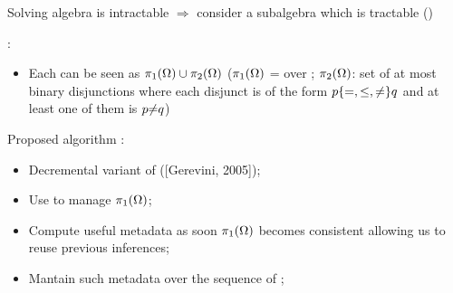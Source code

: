 \begin{frame}{Solving \DOHSATProblemName{}}
    \IAName{} algebra is intractable $\Rightarrow$ consider a subalgebra which is tractable (\OrdHornName{})

    \DOHSATProblemName{}:
    \begin{itemize}
        \item Each \TCSPName{} \IACSP{} can be seen as $\piOne{\IACSP{}} \cup \piTwo{\IACSP{}}$ ($\piOne{\IACSP{}}$ = \TCSPName{} over \PAName{}; $\piTwo{\IACSP{}}$: set of at most binary disjunctions where each disjunct is of the form $p \{=, \leq, \noteq{} \} q$ and at least one of them is $p \noteq{} q$)
    \end{itemize}

    Proposed algorithm \DOHSATAlgorithmName{}:
    \begin{itemize}
        \item Decremental variant of \OHSATAlgorithmName{} ([Gerevini, 2005]);
        \item Use \DPASATAlgorithmName{} to manage $\piOne{\IACSP{}}$;
        \item Compute useful metadata as soon $\piOne{\IACSP{}}$ becomes consistent allowing us to reuse previous \OHSATAlgorithmName{} inferences;
        \item Mantain such metadata over the sequence of \TCSPNames{};
    \end{itemize}
\end{frame}

